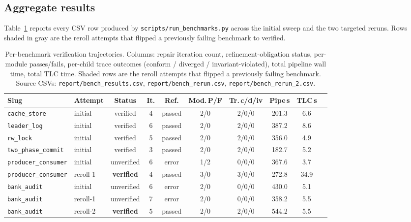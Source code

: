 \documentclass[11pt]{article}
\begin{document}
\subsection{Aggregate results}\label{ssec:bench-agg}

Table~\ref{tbl:results} reports every CSV row produced by
\texttt{scripts/run\_benchmarks.py} across the initial sweep and the
two targeted reruns. Rows shaded in gray are the reroll attempts that
flipped a previously failing benchmark to verified.

\begin{table}[t]
\centering
\small
\setlength{\tabcolsep}{4pt}
\begin{tabular}{llcccccccc}
\toprule
Slug & Attempt & Status & It. & Ref. & Mod.\,P/F & Tr.\,c/d/iv & Pipe\,s & TLC\,s \\
\midrule
\texttt{cache\_store}       & initial  & verified   & 4 & passed & 2/0 & 2/0/0 & 201.3 & 6.6  \\
\texttt{leader\_log}        & initial  & verified   & 6 & passed & 2/0 & 2/0/0 & 387.2 & 8.6  \\
\texttt{rw\_lock}           & initial  & verified   & 5 & passed & 2/0 & 2/0/0 & 356.0 & 4.9  \\
\texttt{two\_phase\_commit} & initial  & verified   & 3 & passed & 2/0 & 2/0/0 & 182.7 & 5.2  \\
\texttt{producer\_consumer} & initial  & unverified & 6 & error  & 1/2 & 0/0/0 & 367.6 & 3.7  \\
\rowcolor{gray!12}
\texttt{producer\_consumer} & reroll-1 & \textbf{verified} & 4 & passed & 3/0 & 3/0/0 & 272.8 & 34.9 \\
\texttt{bank\_audit}        & initial  & unverified & 6 & error  & 2/0 & 0/0/0 & 430.0 & 5.1  \\
\texttt{bank\_audit}        & reroll-1 & unverified & 7 & error  & 2/0 & 0/0/0 & 358.2 & 5.5  \\
\rowcolor{gray!12}
\texttt{bank\_audit}        & reroll-2 & \textbf{verified} & 5 & passed & 2/0 & 2/0/0 & 544.2 & 5.5  \\
\bottomrule
\end{tabular}
\caption{Per-benchmark verification trajectories. Columns: repair
iteration count, refinement-obligation status, per-module passes/fails,
per-child trace outcomes (conform / diverged / invariant-violated),
total pipeline wall time, total TLC time. Shaded rows are the reroll
attempts that flipped a previously failing benchmark.
Source CSVs: \texttt{report/bench\_results.csv},
\texttt{report/bench\_rerun.csv}, \texttt{report/bench\_rerun\_2.csv}.}
\label{tbl:results}
\end{table}
\end{document}
